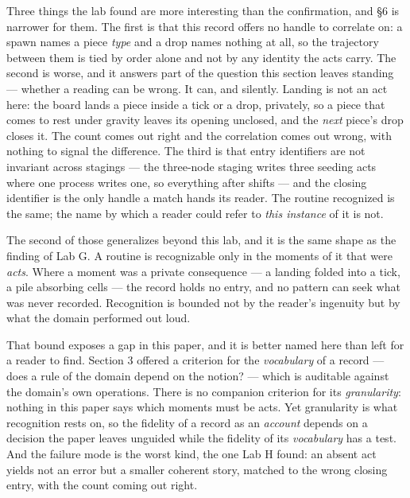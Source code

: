 \documentclass[
]{article}
\begin{document}
Three things the lab found are more interesting than the confirmation,
and §6 is narrower for them. The first is that this record offers no
handle to correlate on: a spawn names a piece \emph{type} and a drop
names nothing at all, so the trajectory between them is tied by order
alone and not by any identity the acts carry. The second is worse, and
it answers part of the question this section leaves standing --- whether
a reading can be wrong. It can, and silently. Landing is not an act
here: the board lands a piece inside a tick or a drop, privately, so a
piece that comes to rest under gravity leaves its opening unclosed, and
the \emph{next} piece's drop closes it. The count comes out right and
the correlation comes out wrong, with nothing to signal the difference.
The third is that entry identifiers are not invariant across stagings
--- the three-node staging writes three seeding acts where one process
writes one, so everything after shifts --- and the closing identifier is
the only handle a match hands its reader. The routine recognized is the
same; the name by which a reader could refer to \emph{this instance} of
it is not.

The second of those generalizes beyond this lab, and it is the same
shape as the finding of Lab G. A routine is recognizable only in the
moments of it that were \emph{acts}. Where a moment was a private
consequence --- a landing folded into a tick, a pile absorbing cells ---
the record holds no entry, and no pattern can seek what was never
recorded. Recognition is bounded not by the reader's ingenuity but by
what the domain performed out loud.

That bound exposes a gap in this paper, and it is better named here than
left for a reader to find. Section 3 offered a criterion for the
\emph{vocabulary} of a record --- does a rule of the domain depend on
the notion? --- which is auditable against the domain's own operations.
There is no companion criterion for its \emph{granularity}: nothing in
this paper says which moments must be acts. Yet granularity is what
recognition rests on, so the fidelity of a record as an \emph{account}
depends on a decision the paper leaves unguided while the fidelity of
its \emph{vocabulary} has a test. And the failure mode is the worst
kind, the one Lab H found: an absent act yields not an error but a
smaller coherent story, matched to the wrong closing entry, with the
count coming out right.
\end{document}
